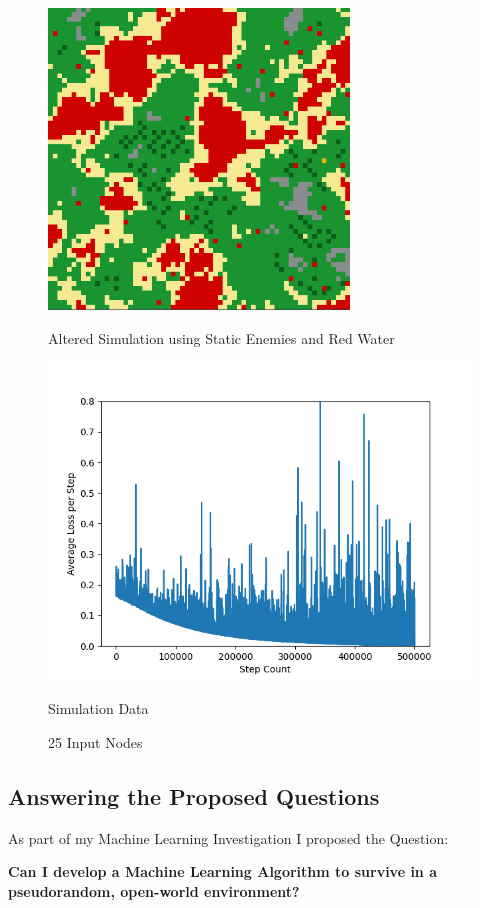 \begin{flushleft}
        \begin{figure}[H]
            \centering
            \includegraphics[width=8cm]{Images/Evaluation/RedWaterTest.PNG}
            \caption*{Altered Simulation using Static Enemies and Red Water}
            \includegraphics[width=12cm]{Images/Evaluation/RedWaterStaticExtra.png}
            \caption*{Simulation Data}
            \caption*{25 Input Nodes}
        \end{figure}

    \pagebreak
    \subsection{Answering the Proposed Questions}
        \vspace{0.2cm}
        As part of my Machine Learning Investigation I proposed the Question:

        \vspace{0.3cm}\begin{center}
        \textbf{Can I develop a Machine Learning Algorithm to survive in a pseudorandom, open-world environment?}
        \end{center}\vspace{0.3cm}


\end{flushleft}
